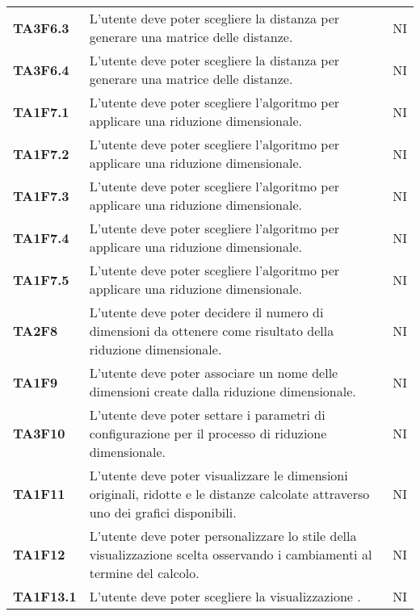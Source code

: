 {\begin{longtable}{ C{2cm} | C{12cm}| C{1.5cm} }
\textbf{TA3F6.3} & 
L'utente deve poter scegliere la distanza \textit{} per generare una matrice delle distanze. & 
NI\\

\textbf{TA3F6.4} & 
L'utente deve poter scegliere la distanza \textit{} per generare una matrice delle distanze. & 
NI\\

\textbf{TA1F7.1} & 
L'utente deve poter scegliere l'algoritmo  per applicare una riduzione dimensionale.  & 
NI\\

\textbf{TA1F7.2} & 
L'utente deve poter scegliere l'algoritmo  per applicare una riduzione dimensionale. & 
NI\\

\textbf{TA1F7.3} & 
L'utente deve poter scegliere l'algoritmo  per applicare una riduzione dimensionale. & 
NI\\

\textbf{TA1F7.4} & 
L'utente deve poter scegliere l'algoritmo  per applicare una riduzione dimensionale. & 
NI\\

\textbf{TA1F7.5} & 
L'utente deve poter scegliere l'algoritmo  per applicare una riduzione dimensionale. & 
NI\\

\textbf{TA2F8} & 
L'utente deve poter decidere il numero di dimensioni da ottenere come risultato della riduzione dimensionale. & 
NI\\

\textbf{TA1F9} & 
L'utente deve poter associare un nome delle dimensioni create dalla riduzione dimensionale. & 
NI\\

\textbf{TA3F10} & 
L'utente deve poter settare i parametri di configurazione per il processo di riduzione dimensionale. & 
NI\\

\textbf{TA1F11} & 
L'utente deve poter visualizzare le dimensioni originali, ridotte e le distanze calcolate attraverso uno dei grafici disponibili. & 
NI\\

\textbf{TA1F12} & 
L'utente deve poter personalizzare lo stile della visualizzazione scelta osservando i cambiamenti al termine del calcolo. & 
NI\\

\textbf{TA1F13.1} & 
L'utente deve poter scegliere la visualizzazione . & 
NI\\


\end{longtable}}
